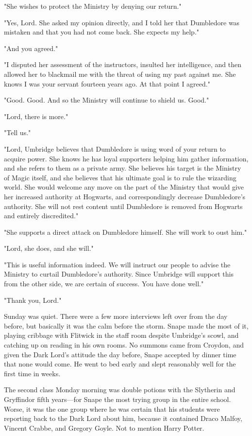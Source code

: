 "She wishes to protect the Ministry by denying our return."

"Yes, Lord. She asked my opinion directly, and I told her that Dumbledore was mistaken and that you had not come back. She expects my help."

"And you agreed."

"I disputed her assessment of the instructors, insulted her intelligence, and then allowed her to blackmail me with the threat of using my past against me. She knows I was your servant fourteen years ago. At that point I agreed."

"Good. Good. And so the Ministry will continue to shield us. Good."

"Lord, there is more."

"Tell us."

"Lord, Umbridge believes that Dumbledore is using word of your return to acquire power. She knows he has loyal supporters helping him gather information, and she refers to them as a private army. She believes his target is the Ministry of Magic itself, and she believes that his ultimate goal is to rule the wizarding world. She would welcome any move on the part of the Ministry that would give her increased authority at Hogwarts, and correspondingly decrease Dumbledore's authority. She will not rest content until Dumbledore is removed from Hogwarts and entirely discredited."

"She supports a direct attack on Dumbledore himself. She will work to oust him."

"Lord, she does, and she will."

"This is useful information indeed. We will instruct our people to advise the Ministry to curtail Dumbledore's authority. Since Umbridge will support this from the other side, we are certain of success. You have done well."

"Thank you, Lord."

Sunday was quiet. There were a few more interviews left over from the day before, but basically it was the calm before the storm. Snape made the most of it, playing cribbage with Flitwick in the staff room despite Umbridge's scowl, and catching up on reading in his own rooms. No summons came from Croydon, and given the Dark Lord's attitude the day before, Snape accepted by dinner time that none would come. He went to bed early and slept reasonably well for the first time in weeks.

The second class Monday morning was double potions with the Slytherin and Gryffindor fifth years—for Snape the most trying group in the entire school. Worse, it was the one group where he was certain that his students were reporting back to the Dark Lord about him, because it contained Draco Malfoy, Vincent Crabbe, and Gregory Goyle. Not to mention Harry Potter.

